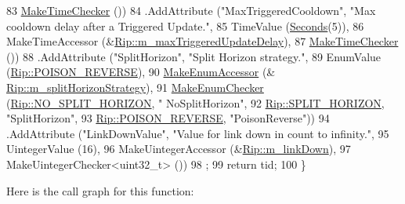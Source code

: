 \begin{DoxyCode}
83                    \hyperlink{group__time_ga7032965bd4afa578691d88c09e4481c1}{MakeTimeChecker} ())
84     .AddAttribute (\textcolor{stringliteral}{"MaxTriggeredCooldown"}, \textcolor{stringliteral}{"Max cooldown delay after a Triggered Update."},
85                    TimeValue (\hyperlink{group__timecivil_ga33c34b816f8ff6628e33d5c8e9713b9e}{Seconds}(5)),
86                    MakeTimeAccessor (&\hyperlink{classns3_1_1Rip_aed7be1d33584f7d7f8b2ca68bfbf3a06}{Rip::m\_maxTriggeredUpdateDelay}),
87                    \hyperlink{group__time_ga7032965bd4afa578691d88c09e4481c1}{MakeTimeChecker} ())
88     .AddAttribute (\textcolor{stringliteral}{"SplitHorizon"}, \textcolor{stringliteral}{"Split Horizon strategy."},
89                    EnumValue (\hyperlink{classns3_1_1Rip_aa65e80d926399a90bc81b30dfc9404a4ad6573915007f19810b223a280519eb86}{Rip::POISON\_REVERSE}),
90                    \hyperlink{namespacens3_af5050739867ce63896dec011e332c8ec}{MakeEnumAccessor} (&
      \hyperlink{classns3_1_1Rip_a2053001529a46356e1f612dfde6b4faf}{Rip::m\_splitHorizonStrategy}),
91                    \hyperlink{namespacens3_a48832781a2b521d3d0091e05ece30615}{MakeEnumChecker} (\hyperlink{classns3_1_1Rip_aa65e80d926399a90bc81b30dfc9404a4a7444cea8e684dd1431a925f01eedfd03}{Rip::NO\_SPLIT\_HORIZON}, \textcolor{stringliteral}{"
      NoSplitHorizon"},
92                                     \hyperlink{classns3_1_1Rip_aa65e80d926399a90bc81b30dfc9404a4a37e78b48a284b4248a999e281e8ea5f9}{Rip::SPLIT\_HORIZON}, \textcolor{stringliteral}{"SplitHorizon"},
93                                     \hyperlink{classns3_1_1Rip_aa65e80d926399a90bc81b30dfc9404a4ad6573915007f19810b223a280519eb86}{Rip::POISON\_REVERSE}, \textcolor{stringliteral}{"PoisonReverse"}))
94     .AddAttribute (\textcolor{stringliteral}{"LinkDownValue"}, \textcolor{stringliteral}{"Value for link down in count to infinity."},
95                    UintegerValue (16),
96                    MakeUintegerAccessor (&\hyperlink{classns3_1_1Rip_a3f37d4c5176e380482edf0be82d2fc18}{Rip::m\_linkDown}),
97                    MakeUintegerChecker<uint32\_t> ())
98     ;
99   \textcolor{keywordflow}{return} tid;
100 \}
\end{DoxyCode}


Here is the call graph for this function\+:



